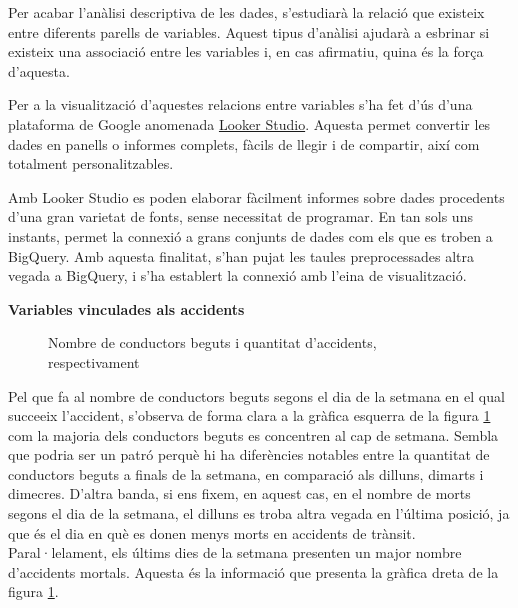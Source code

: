 \documentclass[12pt,longbibliography]{article}
\theoremstyle{definition}
\theoremstyle{remark}
\begin{document}
Per acabar l'anàlisi descriptiva de les dades, s'estudiarà la relació que existeix entre diferents parells de variables. Aquest tipus d'anàlisi ajudarà a esbrinar si existeix una associació entre les variables i, en cas afirmatiu, quina és la força d'aquesta.


Per a la visualització d'aquestes relacions entre variables s'ha fet d'ús d'una plataforma de Google anomenada \href{https://datastudio.google.com/overview}{Looker Studio}. Aquesta permet convertir les dades en panells o informes complets, fàcils de llegir i de compartir, així com totalment personalitzables. 


Amb Looker Studio es poden elaborar fàcilment informes sobre dades procedents d'una gran varietat de fonts, sense necessitat de programar. En tan sols uns instants, permet la connexió a grans conjunts de dades com els que es troben a BigQuery. Amb aquesta finalitat, s'han pujat les taules preprocessades altra vegada a BigQuery, i s'ha establert la connexió amb l'eina de visualització.


\textbf{Variables vinculades als accidents}


\begin{figure}[h!]
\par
{}%
\hfill
{}%
\par

\caption{Nombre de conductors beguts i quantitat d'accidents, respectivament}
\label{fig:G1}
\end{figure}

Pel que fa al nombre de conductors beguts segons el dia de la setmana en el qual succeeix l'accident, s'observa de forma clara a la gràfica esquerra de la figura  \ref{fig:G1} com la majoria dels conductors beguts es concentren al cap de setmana. Sembla que podria ser un patró perquè hi ha diferències notables entre la quantitat de conductors beguts a finals de la setmana, en comparació als dilluns, dimarts i dimecres. D'altra banda, si ens fixem, en aquest cas, en el nombre de morts segons el dia de la setmana, el dilluns es troba altra vegada en l'última posició, ja que és el dia en què es donen menys morts en accidents de trànsit. Paral·lelament, els últims dies de la setmana presenten un major nombre d'accidents mortals. Aquesta és la informació que presenta la gràfica dreta de la figura \ref{fig:G1}.
\end{document}
